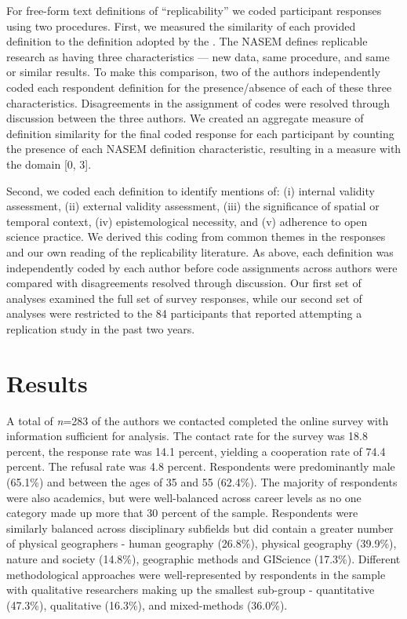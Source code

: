 \documentclass[]{interact}
\theoremstyle{plain}%
\theoremstyle{definition}
\theoremstyle{remark}
\begin{document}
For free-form text definitions of ``replicability'' we coded participant responses using two procedures. 
First, we measured the similarity of each provided definition to the definition adopted by the \citet{NASEM2019}. 
The NASEM defines replicable research as having three characteristics --- new data, same procedure, and same or similar results.
To make this comparison, two of the authors independently coded each respondent definition for the presence/absence of each of these three characteristics.
Disagreements in the assignment of codes were resolved through discussion between the three authors.
We created an aggregate measure of definition similarity for the final coded response for each participant by counting the presence of each NASEM definition characteristic, resulting in a measure with the domain [0, 3].

Second, we coded each definition to identify mentions of: (i) internal validity assessment, (ii) external validity assessment, (iii) the significance of spatial or temporal context, (iv) epistemological necessity, and (v) adherence to open science practice.
We derived this coding from common themes in the responses and our own reading of the replicability literature.
As above, each definition was independently coded by each author before code assignments across authors were compared with disagreements resolved through discussion.
Our first set of analyses examined the full set of survey responses, while our second set of analyses were restricted to the 84 participants that reported attempting a replication study in the past two years.

\section*{Results}
A total of \textit{n}=283 of the authors we contacted completed the online survey with information sufficient for analysis. 
The contact rate for the survey was 18.8 percent, the response rate was 14.1 percent, yielding a cooperation rate of 74.4 percent. 
The refusal rate was 4.8 percent.
Respondents were predominantly male (65.1\%) and between the ages of 35 and 55 (62.4\%). 
The majority of respondents were also academics, but were well-balanced across career levels as no one category made up more that 30 percent of the sample.
Respondents were similarly balanced across disciplinary subfields but did contain a greater number of physical geographers  - human geography (26.8\%), physical geography (39.9\%), nature and society (14.8\%), geographic methods and GIScience (17.3\%). 
Different methodological approaches were well-represented by respondents in the sample with qualitative researchers making up the smallest sub-group  - quantitative (47.3\%), qualitative (16.3\%), and mixed-methods (36.0\%).
\end{document}
